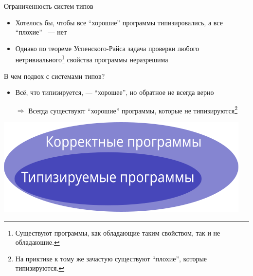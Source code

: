     \begin{frame}{Ограниченность систем типов \popslide}
        \begin{itemize}
            \item Хотелось бы, чтобы все ``хорошие'' программы типизировались, а все ``плохие'' ~--- нет
            \item Однако по теореме Успенского-Райса задача проверки любого нетривиального\footnote{Существуют программы, как обладающие таким свойством, так и не обладающие.} свойства программы неразрешима
        \end{itemize}
        \pause
        \vspace{1em}
        В чем подвох с системами типов? \pause
        \begin{itemize}
            \item Всё, что типизируется, --- ``хорошее'', но обратное не всегда верно
            \item[$\Rightarrow$] Всегда существуют ``хорошие'' программы, которые не типизируются\footnote{На приктике к тому же зачастую существуют ``плохие'', которые типизируются.}
        \end{itemize}
        \begin{center}
            \includegraphics[height=0.25\textheight]{figs/types}
        \end{center}
    \end{frame}

